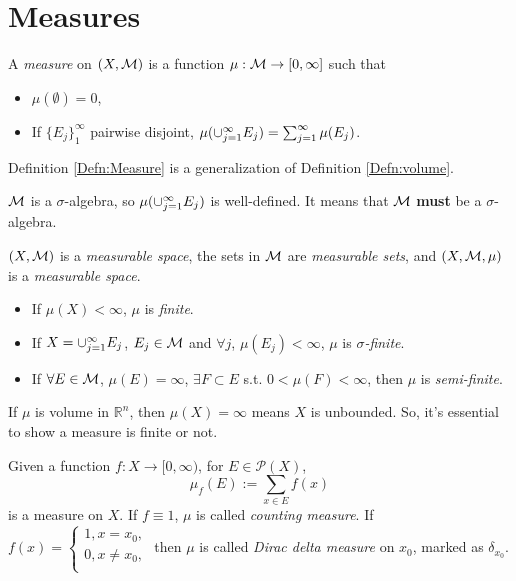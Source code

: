 \section{Measures}
\begin{defn}[Measure]
    \label{Defn:Measure}
    A \textit{measure} on $(X,\mathcal{M})$ is 
    a function $\mu:\mathcal{M}\rightarrow[0,\infty]$ such that 
    \begin{itemize}
        \item $\mu(\emptyset)=0$,
        \item If $\{E_{j}\}_{1}^{\infty}$ pairwise disjoint, 
        $\mu(\cup_{j=1}^{\infty}E_j)=\sum_{j=1}^{\infty}\mu(E_j)$.
    \end{itemize}
\end{defn}
\begin{rem}
    Definition \ref{Defn:Measure} is a 
    generalization of Definition \ref{Defn:volume}.
\end{rem}
\begin{rem}
    $\mathcal{M}$ is a $\sigma$-algebra, so $\mu(\cup_{j=1}^{\infty}E_{j})$ 
    is well-defined. 
    It means that $\mathcal{M}$ \textbf{must} be a $\sigma$-algebra.
\end{rem}
\begin{defn}
    \label{Defn:MeasureWithFinite}
    $(X,\mathcal{M})$ is a \textit{measurable space}, the sets in $\mathcal{M}$ are 
    \textit{measurable sets}, and $(X,\mathcal{M},\mu)$ is a 
    \textit{measurable space}.
    \begin{itemize}
        \item If $\mu(X)<\infty$, $\mu$ is \textit{finite}.
        \item If $X=\cup_{j=1}^{\infty}E_{j}$, $E_{j}\in\mathcal{M}$ and 
        $\forall j$, $\mu(E_j)<\infty$, $\mu$ is 
        \textit{$\sigma$-finite}.
        \item If $\forall E\in\mathcal{M}$, $\mu(E)=\infty$, 
        $\exists F\subset E$ s.t. 
        $0<\mu(F)<\infty$, then $\mu$ is \textit{semi-finite}.
    \end{itemize}
\end{defn}
\begin{rem}
    If $\mu$ is volume in $\mathbb{R}^{n}$, then $\mu(X)=\infty$ 
    means $X$ is unbounded. 
    So, it's essential to show a measure is 
    finite or not.
\end{rem}
\begin{exm}
    \label{Exm:CountingAndDirac}
    Given a function $f:X\rightarrow [0,\infty)$, 
    for $E\in\mathcal{P}(X)$, 
    \begin{displaymath}
        \mu_{f}(E):=\sum_{x\in E}f(x)
    \end{displaymath}
    is a measure on $X$. 
    If $f\equiv 1$, $\mu$ is called \textit{counting measure}. 
    If $f(x)=\left\{\begin{array}{rl}
        1,x=x_0,\\
        0,x\neq x_0,\\
    \end{array}\right.$
    then $\mu$ is called \textit{Dirac delta measure} on $x_{0}$, 
    marked as $\delta_{x_0}$.
\end{exm}
